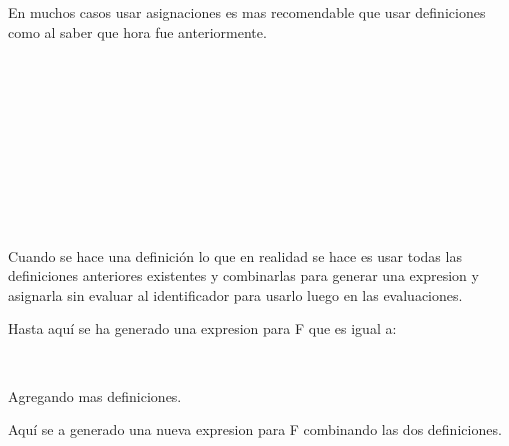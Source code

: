       En muchos casos usar asignaciones es mas recomendable que usar definiciones como al saber que hora fue anteriormente.
      
      \begin{fxcode}
         \\
         \\
         \\
         \\
         \\
         \\
         \\
          \\
         \\
          
      \end{fxcode}
      
      Cuando se hace una definición lo que en realidad se hace es usar todas las definiciones anteriores existentes y combinarlas para generar una expresion y asignarla sin evaluar al identificador para usarlo luego en las evaluaciones.
      
      \begin{fxcode}
      \end{fxcode}
      
      Hasta aquí se ha generado una expresion para F que es igual a:
      
      \begin{fxcode}
         \\
      \end{fxcode}
      
      Agregando mas definiciones.
      
      \begin{fxcode}
      \end{fxcode}
      
      Aquí se a generado una nueva expresion para F combinando las dos definiciones.
      
      \begin{fxcode}
         \\
      \end{fxcode}
      
